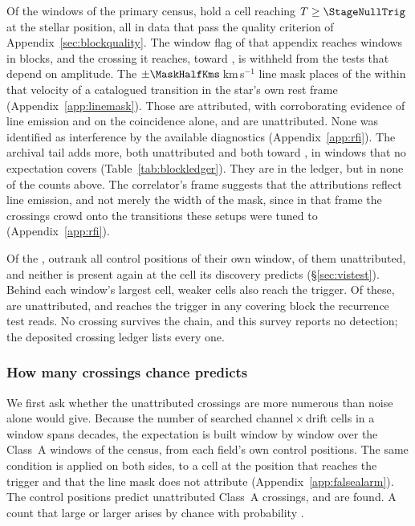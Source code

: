 Of the \NWindows{} windows of the primary census, \CsNCross{} hold a cell
reaching $T\geq\StageNullTrig$ at the stellar position, all in data that pass
the quality criterion of Appendix~\ref{sec:blockquality}. The window flag of
that appendix reaches \DqNWin{} windows in \BkFlagNBlock{} blocks, and the
\BkFlagNCrossOther{} crossing it reaches, toward \BkFlagOtherStar, is
withheld from the tests that depend on amplitude. The
$\pm\MaskHalfKms$\,km\,s$^{-1}$ line mask places \MkNCoinc{} of the
\CsNCrossQp{} within that velocity of a catalogued transition in the star's
own rest frame (Appendix~\ref{app:linemask}). Those \CsNAttrQp{} are
attributed, \LnAttrSupp{} with corroborating evidence of line emission and
\LnAttrCoinc{} on the coincidence alone, and \CsNUnattrQp{} are
unattributed. None was identified as interference by the available
diagnostics (Appendix~\ref{app:rfi}). The archival tail adds
\CeNTailCrossWord{} more, both unattributed and both toward \CeTailStar, in
windows that no expectation covers (Table~\ref{tab:blockledger}). They are in
the ledger, but in none of the counts above. The correlator's frame
suggests that the attributions reflect line emission, and not merely the
width of the mask, since in that frame the crossings crowd onto the
transitions these setups were tuned to (Appendix~\ref{app:rfi}).

Of the \CsNCrossQp, \EvNLeadWord{} outrank all \NCtrl{} control positions of
their own window, \EvNRankQp{} of them unattributed, and neither is present
again at the cell its discovery predicts (\S\ref{sec:vistest}). Behind each
window's largest cell, \CkNSecondaryWord{} weaker cells also reach the
trigger. Of these, \CkNSecUnattrWord{} are unattributed, and \CkNRecurWord{} reaches the
trigger in any covering block the recurrence test reads. No crossing
survives the chain, and this survey reports no detection; the deposited
crossing ledger lists every one.

\subsubsection{How many crossings chance predicts}
\label{sec:trigunif}

We first ask whether the unattributed crossings are more numerous than
noise alone would give. Because the number of searched
channel\,$\times$\,drift cells in a window spans \TuCellsDecades{} decades,
the expectation is built window by window over the \CeNWin{} Class~A windows
of the census, from each field's own control positions. The same condition
is applied on both sides, to a cell at the position that reaches the trigger
and that the line mask does not attribute (Appendix~\ref{app:falsealarm}). The
control positions predict \CeExp{} unattributed Class~A crossings, and
\CeObs{} are found. A count that large or larger arises by chance with
probability \CeProbNull.

